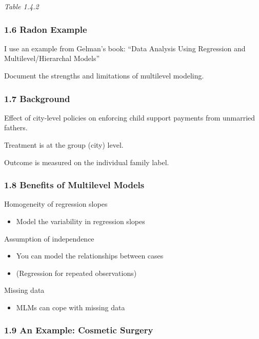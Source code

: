 \documentclass[
]{article}
\providecommand{\tightlist}{%
  \setlength{\itemsep}{0pt}\setlength{\parskip}{0pt}}
\begin{document}
\emph{Table 1.4.2}

\hypertarget{radon-example}{%
\subsubsection{1.6 Radon Example}\label{radon-example}}

I use an example from Gelman's book: ``Data Analysis Using Regression
and Multilevel/Hierarchal Models''

Document the strengths and limitations of multilevel modeling.

\hypertarget{background}{%
\subsubsection{1.7 Background}\label{background}}

Effect of city-level policies on enforcing child support payments from
unmarried fathers.

Treatment is at the group (city) level.

Outcome is measured on the individual family label.

\hypertarget{benefits-of-multilevel-models}{%
\subsubsection{1.8 Benefits of Multilevel
Models}\label{benefits-of-multilevel-models}}

Homogeneity of regression slopes

\begin{itemize}
\tightlist
\item
  Model the variability in regression slopes
\end{itemize}

Assumption of independence

\begin{itemize}
\tightlist
\item
  You can model the relationships between cases
\item
  (Regression for repeated observations)
\end{itemize}

Missing data

\begin{itemize}
\tightlist
\item
  MLMs can cope with missing data
\end{itemize}

\hypertarget{an-example-cosmetic-surgery}{%
\subsubsection{1.9 An Example: Cosmetic
Surgery}\label{an-example-cosmetic-surgery}}
\end{document}
